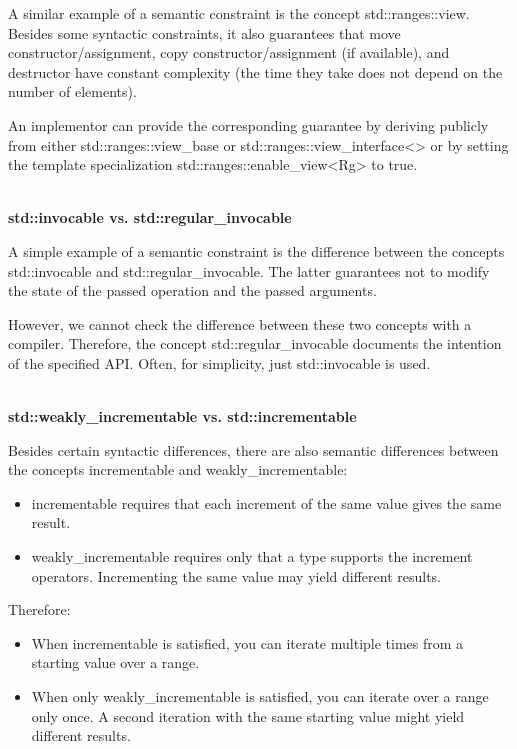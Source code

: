 A similar example of a semantic constraint is the concept std::ranges::view. Besides some syntactic constraints, it also guarantees that move constructor/assignment, copy constructor/assignment (if available), and destructor have constant complexity (the time they take does not depend on the number of elements).

An implementor can provide the corresponding guarantee by deriving publicly from either std::ranges::view\_base or std::ranges::view\_interface<> or by setting the template specialization std::ranges::enable\_view<Rg> to true.

\noindent
\hspace*{\fill} \\ %
\textbf{std::invocable vs. std::regular\_invocable}

A simple example of a semantic constraint is the difference between the concepts std::invocable and std::regular\_invocable. The latter guarantees not to modify the state of the passed operation and the passed arguments.

However, we cannot check the difference between these two concepts with a compiler. Therefore, the concept std::regular\_invocable documents the intention of the specified API. Often, for simplicity, just std::invocable is used.

\noindent
\hspace*{\fill} \\ %
\textbf{std::weakly\_incrementable vs. std::incrementable}

Besides certain syntactic differences, there are also semantic differences between the concepts incrementable and weakly\_incrementable:

\begin{itemize}
\item
incrementable requires that each increment of the same value gives the same result.

\item
weakly\_incrementable requires only that a type supports the increment operators. Incrementing the same value may yield different results.
\end{itemize}

Therefore:

\begin{itemize}
\item
When incrementable is satisfied, you can iterate multiple times from a starting value over a range.

\item
When only weakly\_incrementable is satisfied, you can iterate over a range only once. A second iteration with the same starting value might yield different results.
\end{itemize}

